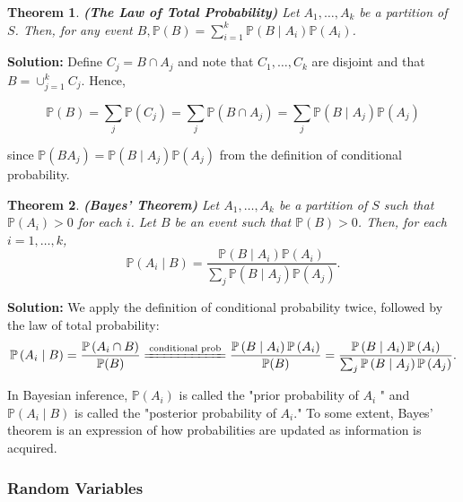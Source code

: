 \documentclass[13pt]{article}
\newtheorem{theorem}{Theorem}[section]
\theoremstyle{definition}
\newenvironment{solution}
{\color{C2}\begin{framed}\begingroup\textbf{Solution:} }
  {\endgroup\end{framed}}
\theoremstyle{remark}
\newenvironment{remark}
  {\pushQED{\qed}\renewcommand{\qedsymbol}{$\triangle$}\remarkx}
  {\popQED\endremarkx}
\newcommand{\PP}{\mathbb{P}}
\begin{document}
\begin{theorem}\textbf{(The Law of Total Probability)} Let $A_{1}, \ldots, A_{k}$ be a partition of $S$. Then, for any event $B, \PP(B)=\sum_{i=1}^{k} \PP\left(B \mid A_{i}\right) \PP\left(A_{i}\right)$.
\end{theorem}

\begin{solution} Define $C_{j}=B \cap A_{j}$ and note that $C_{1}, \ldots, C_{k}$ are disjoint and that $B=\cup_{j=1}^{k} C_{j}$. Hence,

$$
\PP(B)=\sum_{j} \PP\left(C_{j}\right)=\sum_{j} \PP\left(B \cap A_{j}\right)=\sum_{j} \PP\left(B \mid A_{j}\right) \PP\left(A_{j}\right)
$$

since $\PP\left(B A_{j}\right)=\PP\left(B \mid A_{j}\right) \PP\left(A_{j}\right)$ from the definition of conditional probability.
\end{solution}


\begin{theorem}\textbf{(Bayes' Theorem)} Let $A_{1}, \ldots, A_{k}$ be a partition of $S$ such that $\PP\left(A_{i}\right)>0$ for each $i$. Let $B$ be an event such that $\PP(B)>0$. Then, for each $i=1, \ldots, k$,
\[
\PP\left(A_{i} \mid B\right)=\frac{\PP\left(B \mid A_{i}\right) \PP\left(A_{i}\right)}{\sum_{j} \PP\left(B \mid A_{j}\right) \PP\left(A_{j}\right)} .
\]
\end{theorem}
\begin{solution}We apply the definition of conditional probability twice, followed by the law of total probability:
\[
\PP\left(A_{i} \mid B\right)=\frac{\PP\left(A_{i} \cap B\right)}{\PP(B)}\xlongequal{\text{conditional prob}}\frac{\PP\left(B \mid A_{i}\right) \PP\left(A_{i}\right)}{\PP(B)}=\frac{\PP\left(B \mid A_{i}\right) \PP\left(A_{i}\right)}{\sum_{j} \PP\left(B \mid A_{j}\right) \PP\left(A_{j}\right)}.
\]
\end{solution}
\begin{remark}
    In Bayesian inference, $\PP\left(A_{i}\right)$ is called the "prior probability of $A_{i}$ " and $\PP\left(A_{i} \mid B\right)$ is called the "posterior probability of $A_{i}$." To some extent, Bayes' theorem is an expression of how probabilities are updated as information is acquired. 
\end{remark}

\subsubsection{Random Variables}
\end{document}
